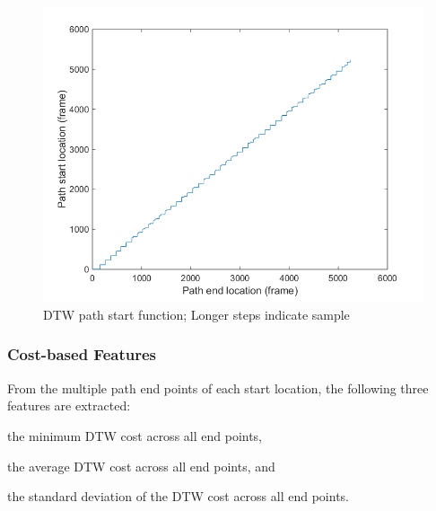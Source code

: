 \documentclass{article}
\begin{document}
\begin{figure}[t]
\centering
\includegraphics[width=\linewidth]{DTWpath.png}
\caption{DTW path start function; Longer steps indicate sample}
\label{fig4}
\end{figure}


\subsubsection{Cost-based Features}
From the multiple path end points of each start location, the following three features are extracted: 
\begin{inparaenum}[(i)]
    \item   the minimum DTW cost across all end points,
    \item   the average DTW cost across all end points, and
    \item   the standard deviation of the DTW cost across all end points.
\end{inparaenum}
\end{document}
